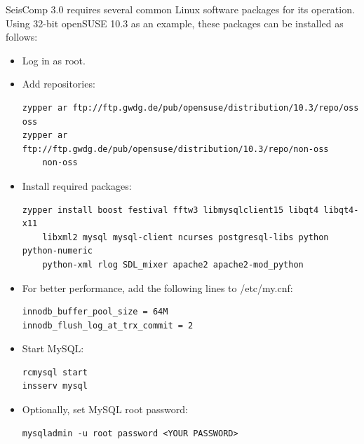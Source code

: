 \documentclass[11pt,a4paper,titlepage]{article}
\newcommand{\seiscomp}{SeisComp }
\begin{document}
\seiscomp 3.0 requires several common Linux software packages for its
operation. Using 32-bit openSUSE 10.3 as an example, these packages can be
installed as follows:
\begin{itemize}
\item Log in as root.

\item Add repositories:
\begin{verbatim}
zypper ar ftp://ftp.gwdg.de/pub/opensuse/distribution/10.3/repo/oss oss
zypper ar ftp://ftp.gwdg.de/pub/opensuse/distribution/10.3/repo/non-oss 
    non-oss
\end{verbatim}

\item Install required packages:
\begin{verbatim}
zypper install boost festival fftw3 libmysqlclient15 libqt4 libqt4-x11
    libxml2 mysql mysql-client ncurses postgresql-libs python python-numeric
    python-xml rlog SDL_mixer apache2 apache2-mod_python
\end{verbatim}

\item For better performance, add the following lines to /etc/my.cnf:
\begin{verbatim}
innodb_buffer_pool_size = 64M
innodb_flush_log_at_trx_commit = 2
\end{verbatim}

\item Start MySQL:
\begin{verbatim}
rcmysql start
insserv mysql
\end{verbatim}

\item Optionally, set MySQL root password:
\begin{verbatim}
mysqladmin -u root password <YOUR PASSWORD>
\end{verbatim}
\end{itemize}
\end{document}

